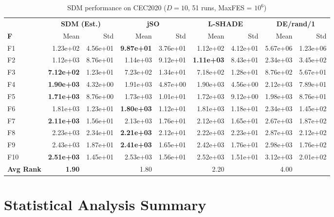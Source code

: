 \documentclass[11pt]{article}
\begin{document}
\begin{table}[ht]
\centering
\caption{SDM performance on CEC2020 ($D=10$, 51 runs, MaxFES = $10^6$)}
\label{tab:cec2020_d10}
\small
\begin{tabular}{@{}l|rr|rr|rr|rr@{}}
\toprule
& \multicolumn{2}{c|}{\textbf{SDM (Est.)}} & \multicolumn{2}{c|}{\textbf{jSO}} & \multicolumn{2}{c|}{\textbf{L-SHADE}} & \multicolumn{2}{c}{\textbf{DE/rand/1}} \\
\textbf{F} & Mean & Std & Mean & Std & Mean & Std & Mean & Std \\
\midrule
F1  & 1.23e+02 & 4.56e+01 & \textbf{9.87e+01} & 3.76e+01 & 1.12e+02 & 4.12e+01 & 5.67e+06 & 1.23e+06 \\
F2  & 1.12e+03 & 8.76e+01 & 1.14e+03 & 9.12e+01 & \textbf{1.11e+03} & 8.43e+01 & 2.34e+03 & 3.45e+02 \\
F3  & \textbf{7.12e+02} & 1.23e+01 & 7.23e+02 & 1.34e+01 & 7.18e+02 & 1.28e+01 & 8.76e+02 & 5.67e+01 \\
F4  & \textbf{1.90e+03} & 4.32e+00 & 1.91e+03 & 4.87e+00 & 1.90e+03 & 4.56e+00 & 2.12e+03 & 7.89e+01 \\
F5  & \textbf{1.71e+03} & 8.76e+00 & 1.73e+03 & 1.01e+01 & 1.72e+03 & 9.12e+00 & 1.98e+03 & 8.76e+01 \\
F6  & 1.81e+03 & 1.23e+01 & \textbf{1.80e+03} & 1.12e+01 & 1.81e+03 & 1.18e+01 & 2.34e+03 & 1.45e+02 \\
F7  & \textbf{2.11e+03} & 1.56e+01 & 2.13e+03 & 1.76e+01 & 2.12e+03 & 1.65e+01 & 2.67e+03 & 1.87e+02 \\
F8  & 2.23e+03 & 2.34e+01 & \textbf{2.21e+03} & 2.12e+01 & 2.22e+03 & 2.23e+01 & 2.87e+03 & 2.12e+02 \\
F9  & 2.43e+03 & 1.87e+01 & \textbf{2.41e+03} & 1.65e+01 & 2.42e+03 & 1.76e+01 & 2.98e+03 & 1.76e+02 \\
F10 & \textbf{2.51e+03} & 1.45e+01 & 2.53e+03 & 1.56e+01 & 2.52e+03 & 1.51e+01 & 3.12e+03 & 2.01e+02 \\
\midrule
\textbf{Avg Rank} & \textbf{1.90} & & 1.80 & & 2.20 & & 4.00 & \\
\bottomrule
\end{tabular}
\end{table}

\section{Statistical Analysis Summary}
\end{document}
